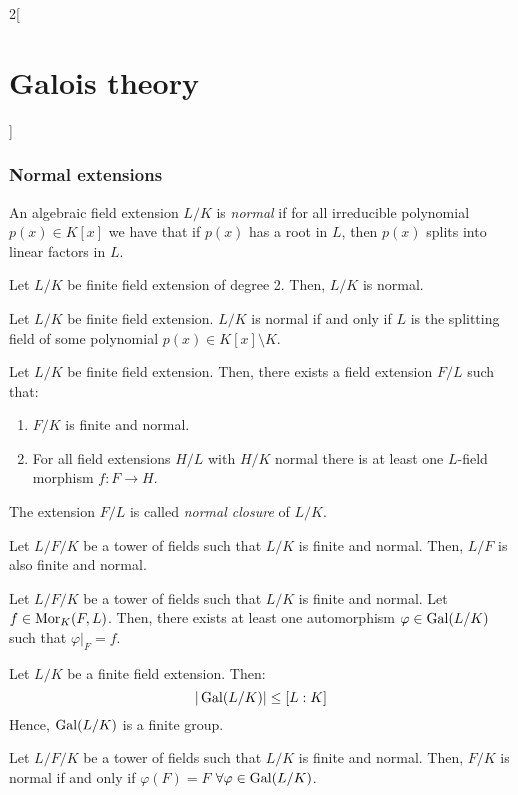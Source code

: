 \documentclass[../../../main_math.tex]{subfiles}
\begin{document}
\begin{multicols}{2}[\section{Galois theory}]
  \subsubsection{Normal extensions}
  \begin{definition}
    An algebraic field extension $L/K$ is \emph{normal} if for all irreducible polynomial $p(x)\in K[x]$ we have that if $p(x)$ has a root in $L$, then $p(x)$ splits into linear factors in $L$.
  \end{definition}
  \begin{proposition}
    Let $L/K$ be finite field extension of degree 2. Then, $L/K$ is normal.
  \end{proposition}
  \begin{theorem}
    Let $L/K$ be finite field extension. $L/K$ is normal if and only if $L$ is the splitting field of some polynomial $p(x)\in K[x]\setminus K$.
  \end{theorem}
  \begin{corollary}
    Let $L/K$ be finite field extension. Then, there exists a field extension $F/L$ such that:
    \begin{enumerate}
      \item $F/K$ is finite and normal.
      \item For all field extensions $H/L$ with $H/K$ normal there is at least one $L$-field morphism $f:F\rightarrow H$.
    \end{enumerate}
    The extension $F/L$ is called \emph{normal closure} of $L/K$.
  \end{corollary}
  \begin{corollary}
    Let $L/F/K$ be a tower of fields such that $L/K$ is finite and normal. Then, $L/F$ is also finite and normal.
  \end{corollary}
  \begin{corollary}
    Let $L/F/K$ be a tower of fields such that $L/K$ is finite and normal. Let $f\in\operatorname{Mor}_K(F,L)$. Then, there exists at least one automorphism $\varphi\in\operatorname{Gal}(L/K)$ such that $\varphi|_F=f$.
  \end{corollary}
  \begin{corollary}
    Let $L/K$ be a finite field extension. Then: $$|\operatorname{Gal}(L/K)|\leq[L:K]$$ Hence, $\operatorname{Gal}(L/K)$ is a finite group.
  \end{corollary}
  \begin{corollary}
    Let $L/F/K$ be a tower of fields such that $L/K$ is finite and normal. Then, $F/K$ is normal if and only if $\varphi(F)=F$ $\forall\varphi\in\operatorname{Gal}(L/K)$.
  \end{corollary}

\end{multicols}
\end{document}
